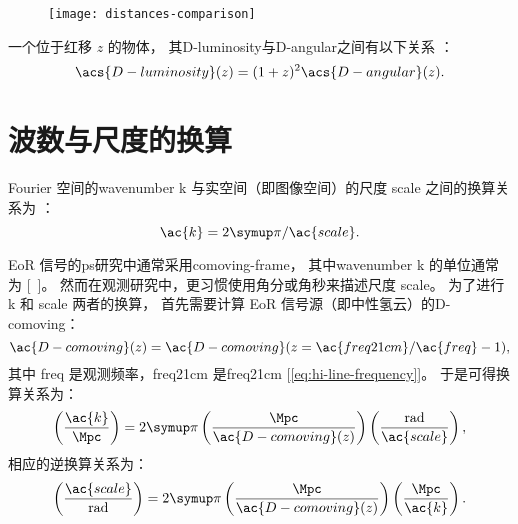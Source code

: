 \begin{figure}[htp]
  \centering
  \texttt{[image: distances-comparison]}
  \label{fig:distance-measures}
\end{figure}

一个位于红移 $z$ 的物体，
其\acl{D-luminosity}与\acl{D-angular}之间有以下关系
\cite{weinberg1972,hogg1999,ellis2007}：
\begin{equation}
  \label{eq:dl-da}
  \acs{D-luminosity}(z) = (1+z)^2 \acs{D-angular}(z) .
\end{equation}


\section{波数与尺度的换算}
\label{sec:wavenumber-scale-conv}

Fourier 空间的\ac{wavenumber} \ac{k} 与实空间（即图像空间）的尺度 \ac{scale}
之间的换算关系为 \cite{peebles1980,baugh2000}：
\begin{equation}
  \ac{k} = 2\Cpi / \ac{scale} .
\end{equation}

EoR 信号的\ac{ps}研究中通常采用\ac{comoving-frame}，
其中\ac{wavenumber} \ac{k} 的单位通常为 [\si{\per\Mpc}]。
然而在观测研究中，更习惯使用角分或角秒来描述尺度 \ac{scale}。
为了进行 \ac{k} 和 \ac{scale} 两者的换算，
首先需要计算 EoR 信号源（即中性氢云）的\acl{D-comoving}：
\begin{equation}
  \ac{D-comoving}(z) =
    \ac{D-comoving}(z = \ac{freq21cm} / \ac{freq} - 1) ,
\end{equation}
其中 \ac{freq} 是观测频率，\ac{freq21cm} 是\acl{freq21cm}
[\autoref{eq:hi-line-frequency}]。
于是可得换算关系为：
\begin{equation}
  \left( \frac{\ac{k}}{\si{\per\Mpc}} \right) =
    2\Cpi \left( \frac{\si{\Mpc}}{\ac{D-comoving}(z)} \right)
    \left( \frac{\si{rad}}{\ac{scale}} \right) ,
\end{equation}
相应的逆换算关系为：
\begin{equation}
  \left( \frac{\ac{scale}}{\si{rad}} \right) =
    2\Cpi \left( \frac{\si{\Mpc}}{\ac{D-comoving}(z)} \right)
    \left( \frac{\si{\per\Mpc}}{\ac{k}} \right) .
\end{equation}


